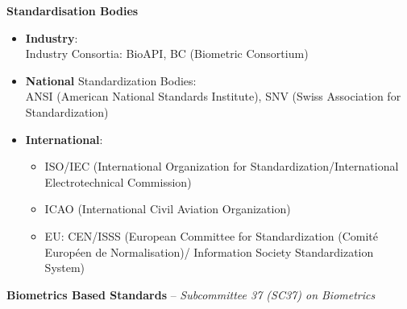 \documentclass[a4paper]{article}
\begin{document}
      \textbf{Standardisation Bodies}
      \begin{itemize}
        \item \textbf{Industry}:\\
        Industry Consortia: BioAPI, BC (Biometric Consortium)
        \item \textbf{National} Standardization Bodies:\\
        ANSI (American National Standards Institute), SNV (Swiss Association for Standardization)
        \item \textbf{International}:
        \begin{itemize}
          \item ISO/IEC (International Organization for Standardization/International Electrotechnical Commission)
          \item ICAO (International Civil Aviation Organization)
          \item EU: CEN/ISSS (European Committee for Standardization (Comité Européen de Normalisation)/ Information Society Standardization System)
        \end{itemize}
      \end{itemize}
      \textbf{Biometrics Based Standards} -- \emph{Subcommittee 37 (SC37) on Biometrics}
\end{document}

